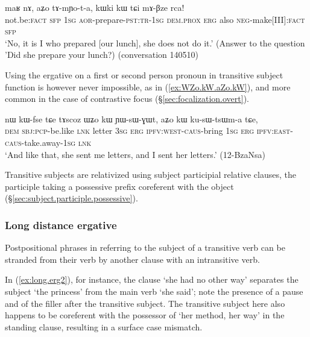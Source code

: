 \begin{exe}
\ex \label{ex:aZo.tAmYota}
\gll maʁ nɤ, aʑo tɤ-mɲo-t-a, kɯki kɯ tɕi mɤ-βze rca!  \\
not.be:\textsc{fact} \textsc{sfp} \textsc{1sg} \textsc{aor}-prepare-\textsc{pst}:\textsc{tr}-\textsc{1sg} \textsc{dem}.\textsc{prox} \textsc{erg} also \textsc{neg}-make[III]:\textsc{fact} \textsc{sfp} \\
\glt `No, it is I who prepared [our lunch], she does not do it.' (Answer to the question 'Did she prepare your lunch?) (conversation 140510)
\end{exe}

Using the ergative on a first  or second person pronoun in transitive subject function is however never impossible, as in (\ref{ex:WZo.kW.aZo.kW}), and more common in the case of contrastive focus (§\ref{sec:focalization.overt}).

\begin{exe}
\ex \label{ex:WZo.kW.aZo.kW}
\gll nɯ kɯ-fse tɕe tɤscoz ɯʑo kɯ ɲɯ-sɯ-ɣɯt, aʑo kɯ ku-sɯ-tsɯm-a tɕe, \\
\textsc{dem} \textsc{sbj}:\textsc{pcp}-be.like \textsc{lnk} letter \textsc{3sg} \textsc{erg} \textsc{ipfv}:\textsc{west}-\textsc{caus}-bring \textsc{1sg} \textsc{erg} \textsc{ipfv}:\textsc{east}-\textsc{caus}-take.away-\textsc{1sg} \textsc{lnk} \\
\glt `And like that, she sent me letters, and I sent her letters.' (12-BzaNsa) 
\end{exe}

Transitive subjects are relativized using subject  participial relative clauses, the participle taking a possessive prefix coreferent with the object (§\ref{sec:subject.participle.possessive}). 

\subsubsection{Long distance ergative} \label{sec:long.distance.kW}
 
Postpositional phrases in  referring to the subject of a transitive verb can be stranded from their verb by another clause with an intransitive verb. 

In (\ref{ex:long.erg2}), for instance, the clause   `she had no other way' separates the subject  `the princess' from the main verb  `she said'; note the presence of a pause and of the filler  after the transitive subject. The transitive subject here also happens to be coreferent with the possessor of  `her method, her way' in the standing clause, resulting in a surface case mismatch.


